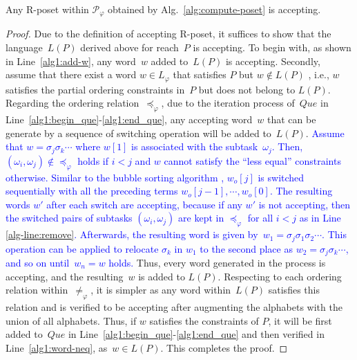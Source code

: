 \begin{lemma}\label{lemma:accepting-poset}
Any R-poset within $\mathcal{P}_{\varphi}$ obtained by Alg.~\ref{alg:compute-poset}
is accepting.
\end{lemma}
\begin{proof}

Due to the definition of accepting R-poset, it suffices to show that the
language~$L(P)$ derived above for reach~$P$ is accepting.
To begin with, as shown in Line~\ref{alg1:add-w}, any word~$w$ added to~$L(P)$
is accepting. %
Secondly, assume that there exist a word $w\in L_{\varphi}$ that satisfies $P$ but $w\not\in L(P)$%
, i.e., $w$ satisfies the partial ordering constraints in~$P$ but does not belong to $L(P)$.
Regarding the ordering relation~$\preceq_{\varphi}$,
due to the iteration process of~$Que$ in Line~\ref{alg1:begin_que}-\ref{alg1:end_que},
any accepting word~$w$ that can be generate by a sequence of switching operation will be added
to~$L(P)$. \textcolor{blue}{Assume that $w=\sigma_j\sigma_k\cdots$
  where $w[1]$ is associated with the subtask~$\omega_j$.
Then, $(\omega_i,\omega_j)\notin \preceq_\varphi$ holds if $ i<j$ and $w$ cannot satisfy the ``less equal'' constraints otherwise.
 Similar to the bubble sorting algorithm \citep{astrachan2003bubble},
$w_o[j]$ is switched sequentially with all the preceding terms $w_o[j-1],\cdots,w_o[0]$.
The resulting words $w'$ after each switch are accepting,
because if any $w'$ is not accepting, then the switched pairs of subtasks
$(\omega_i,\omega_j)$ are kept in $\preceq_\varphi$ for all $i<j$ as in Line \ref{alg-line:remove}.
Afterwards, the resulting word is given by~$w_1=\sigma_j\sigma_1\sigma_2\cdots$.
This operation can be applied to relocate $\sigma_k$ in $w_1$ to the second
place as $w_2=\sigma_j\sigma_k\cdots$, and so on until~$w_n=w$ holds.}
Thus, every word generated in the process is accepting,
and the resulting~$w$ is added to $L(P)$.
Respecting to each ordering relation within~$\neq_{\varphi}$, it is simpler
as any word within~$L(P)$ satisfies this relation and is verified to be accepting
after augmenting the alphabets with the union of all alphabets.
Thus, if $w$ satisfies the constraints of $P$, it will be first added to~$Que$ in
Line~\ref{alg1:begin_que}-\ref{alg1:end_que} and then
verified in Line~\ref{alg1:word-neq}, as~$w\in L(P)$. This completes the proof.

\end{proof}
